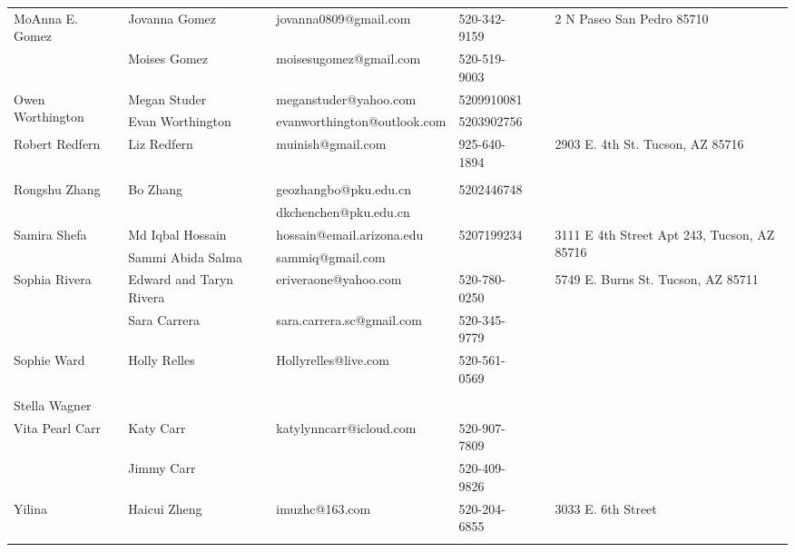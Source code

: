 \documentclass[landscape]{article}\usepackage[]{graphicx}\usepackage[]{color}
\begin{document}
\begin{longtable}{|p{100pt}|p{100pt}|p{140pt}|p{60pt}|p{64pt}|p{120pt}|}
\hline
\multirow{2}{100pt}{MoAnna E. Gomez} & Jovanna Gomez & jovanna0809@gmail.com & 520-342-9159 &  & \multirow{2}{120pt}{2 N Paseo San Pedro 85710} \\
 & Moises Gomez & moisesugomez@gmail.com & 520-519-9003 &  & \\
\hline
\multirow{2}{100pt}{Owen Worthington} & Megan Studer & meganstuder@yahoo.com & 5209910081 &  & \multirow{2}{120pt}{} \\
 & Evan Worthington & evanworthington@outlook.com & 5203902756 &  & \\
\hline
\multirow{2}{100pt}{Robert Redfern} & Liz Redfern & muinish@gmail.com & 925-640-1894 &  & \multirow{2}{120pt}{2903 E. 4th St. Tucson, AZ 85716} \\
 &  &  &  &  & \\
\hline
\multirow{2}{100pt}{Rongshu Zhang} & Bo Zhang & geozhangbo@pku.edu.cn & 5202446748 &  & \multirow{2}{120pt}{} \\
 &  & dkchenchen@pku.edu.cn &  &  & \\
\hline
\multirow{2}{100pt}{Samira Shefa} & Md Iqbal Hossain & hossain@email.arizona.edu & 5207199234 &  & \multirow{2}{120pt}{3111 E 4th Street Apt 243, Tucson, AZ 85716} \\
 & Sammi Abida Salma & sammiq@gmail.com &  &  & \\
\hline
\multirow{2}{100pt}{Sophia Rivera} & Edward and Taryn Rivera & eriveraone@yahoo.com & 520-780-0250 &  & \multirow{2}{120pt}{5749 E. Burns St. Tucson, AZ 85711} \\
 & Sara Carrera & sara.carrera.sc@gmail.com & 520-345-9779 &  & \\
\hline
\multirow{2}{100pt}{Sophie Ward} & Holly Relles & Hollyrelles@live.com & 520-561-0569 &  & \multirow{2}{120pt}{} \\
 &  &  &  &  & \\
\hline
\multirow{2}{100pt}{Stella Wagner} &  &  &  &  & \multirow{2}{120pt}{} \\
 &  &  &  &  & \\
\hline
\multirow{2}{100pt}{Vita Pearl Carr} & Katy Carr & katylynncarr@icloud.com & 520-907-7809 &  & \multirow{2}{120pt}{} \\
 & Jimmy Carr &  & 520-409-9826 &  & \\
\hline
\multirow{2}{100pt}{Yilina} & Haicui Zheng & imuzhc@163.com & 520-204-6855 &  & \multirow{2}{120pt}{3033 E. 6th Street} \\
 &  &  &  &  & \\
\hline
\end{longtable}
\newpage
\end{document}
